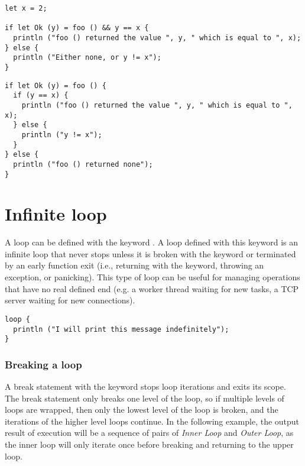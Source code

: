 

\begin{lstlisting}[style=coloredverbatim, caption=Using a pattern guard]
let x = 2;

if let Ok (y) = foo () && y == x {
  println ("foo () returned the value ", y, " which is equal to ", x);
} else {
  println ("Either none, or y != x");
}
\end{lstlisting}

\begin{lstlisting}[style=coloredverbatim, caption=Using a second condition instead of pattern guard, label=lst:using_second_cond_no_guard]
if let Ok (y) = foo () {
  if (y == x) {
    println ("foo () returned the value ", y, " which is equal to ", x);
  } else {
    println ("y != x");
  }
} else {
  println ("foo () returned none");
}
\end{lstlisting}

\section{Infinite loop}%
\label{sec:inf_loop}

A loop can be defined with the keyword . A loop defined with this
keyword is an infinite loop that never stops unless it is broken with the
 keyword or terminated by an early function exit (i.e., returning
with the  keyword, throwing an exception, or panicking). This type
of loop can be useful for managing operations that have no real defined end
(e.g. a worker thread waiting for new tasks, a TCP server waiting for new
connections).

\begin{lstlisting}[style=coloredverbatim, escapechar=@]
loop {
  println ("I will print this message indefinitely");
}
\end{lstlisting}

\subsubsection{Breaking a loop}
\label{sec:breaking_loops}

A break statement with the keyword  stops loop iterations and exits
its scope. The break statement only breaks one level of the loop, so if multiple
levels of loops are wrapped, then only the lowest level of the loop is broken,
and the iterations of the higher level loops continue. In the following example,
the output result of execution will be a sequence of pairs of \textit{Inner
  Loop} and \textit{Outer Loop}, as the inner loop will only iterate once before
breaking and returning to the upper loop.

